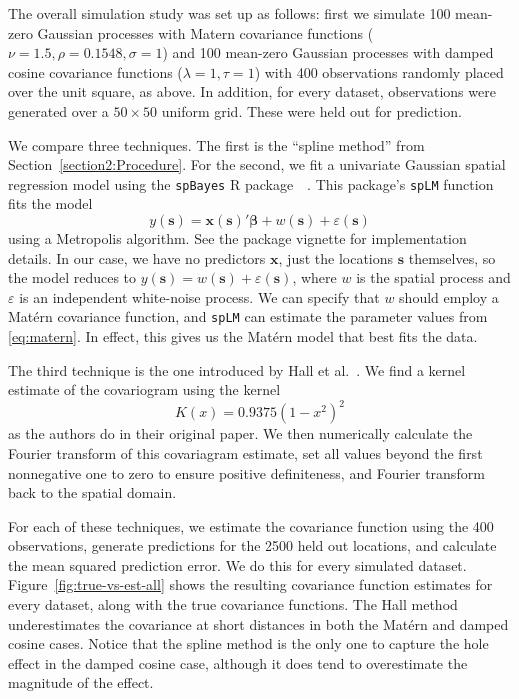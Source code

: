\documentclass[12pt]{article}
\begin{document}
The overall simulation study was set up as follows: first we simulate 100 mean-zero Gaussian processes with Matern covariance functions ($\nu = 1.5, \rho = 0.1548, \sigma = 1$) and 100 mean-zero Gaussian processes with damped cosine covariance functions ($\lambda = 1, \tau = 1$) with 400 observations randomly placed over the unit square, as above. In addition, for every dataset, observations were generated over a $50\times50$ uniform grid. These were held out for prediction.

We compare three techniques. The first is the ``spline method'' from Section~\ref{section2:Procedure}. For the second, we fit a univariate Gaussian spatial regression model using the \texttt{spBayes} R package~\cite{spBayes1}~\cite{spBayes2}. This package's \texttt{spLM} function fits the model
\[
  y(\bm{s}) = \bm{x}(\bm{s})'\bm{\beta} + w(\bm{s}) + \varepsilon(\bm{s})
\]
using a Metropolis algorithm. See the package vignette for implementation details. In our case, we have no predictors $\bm{x}$, just the locations $\bm{s}$ themselves, so the model reduces to $y(\bm{s}) = w(\bm{s}) + \varepsilon(\bm{s})$, where $w$ is the spatial process and $\varepsilon$ is an independent white-noise process. We can specify that $w$ should employ a Mat\'{e}rn covariance function, and \texttt{spLM} can estimate the parameter values from \eqref{eq:matern}. In effect, this gives us the Mat\'{e}rn model that best fits the data.

The third technique is the one introduced by Hall et al.~\cite{Hall1994}. We find a kernel estimate of the covariogram using the kernel
\[
  K(x) = 0.9375(1 - x^2)^2
\]
as the authors do in their original paper. We then numerically calculate the Fourier transform of this covariagram estimate, set all values beyond the first nonnegative one to zero to ensure positive definiteness, and Fourier transform back to the spatial domain.

For each of these techniques, we estimate the covariance function using the 400 observations, generate predictions for the 2500 held out locations, and calculate the mean squared prediction error. We do this for every simulated dataset. Figure~\ref{fig:true-vs-est-all} shows the resulting covariance function estimates for every dataset, along with the true covariance functions. The Hall method underestimates the covariance at short distances in both the Mat\'{e}rn and damped cosine cases. Notice that the spline method is the only one to capture the hole effect in the damped cosine case, although it does tend to overestimate the magnitude of the effect.
\end{document}
